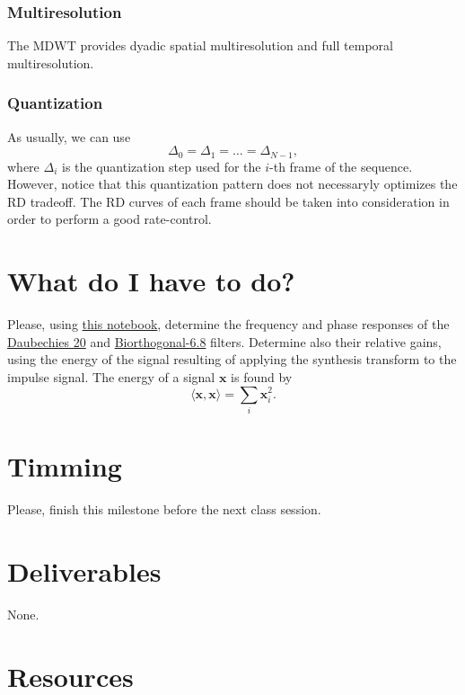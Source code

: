 \subsubsection{Multiresolution}
The $\text{MDWT}$ provides dyadic spatial multiresolution and full
temporal multiresolution.

\subsubsection{Quantization}
As usually, we can use
\begin{equation}
  \Delta_0=\Delta_1=\dots=\Delta_{N-1},
\end{equation}
where $\Delta_i$ is the quantization step used for the $i$-th frame of
the sequence. However, notice that this quantization pattern does not
necessaryly optimizes the RD tradeoff. The RD curves of each frame
should be taken into consideration in order to perform a good
rate-control.

\section{What do I have to do?}

Please, using
\href{https://github.com/Sistemas-Multimedia/Sistemas-Multimedia.github.io/blob/master/milestones/07-DWT/dwt_filters_analysis.ipynb}{this
  notebook}, determine the frequency and phase responses of the
\href{http://wavelets.pybytes.com/wavelet/db20/}{Daubechies 20} and
\href{http://wavelets.pybytes.com/wavelet/bior6.8/}{Biorthogonal-6.8}
filters. Determine also their relative gains, using the energy of the
signal resulting of applying the synthesis transform to the impulse
signal. The energy of a signal ${\mathbf x}$ is found by
\begin{equation}
  \langle {\mathbf x}, {\mathbf x}\rangle =  \sum_{i}{{\mathbf x}_i^2}.
\end{equation}

\section{Timming}

Please, finish this milestone before the next class session.

\section{Deliverables}

None.

\section{Resources}

\renewcommand{\addcontentsline}[3]{}%

